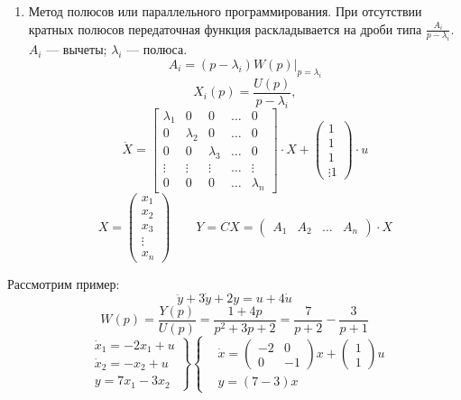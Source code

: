 \begin{enumerate}
	\item Метод полюсов или параллельного программирования.
		При отсутствии кратных полюсов передаточная функция раскладывается на дроби
		типа $\frac{A_i}{p - \lambda_i}$. $A_i$ --- вычеты; $\lambda_i$ --- полюса.
		\[A_i = (p - \lambda_i)W(p) |_{p=\lambda_i}\]
		\[X_i(p) = \frac{U(p)}{p-\lambda_i}, \]
		\[\dot X = \begin{bmatrix} \lambda_1 & 0 & 0 & \hdots & 0 \\
			0 & \lambda_2 & 0 & \hdots & 0 \\
			0 & 0 & \lambda_3 & \hdots & 0 \\
			\vdots & \vdots & \vdots & \hdots & \vdots\\
			0 & 0 & 0 & \hdots & \lambda_n
			\end{bmatrix} \cdot X + \begin{pmatrix}
			1 \\ 1\\ 1\\ \vdots 1
		\end{pmatrix} \cdot u\]
		\[X = \begin{pmatrix}x_1 \\ x_2 \\ x_3 \\ \vdots \\ x_n \end{pmatrix}\qquad Y = CX
			= \begin{pmatrix}A_1 & A_2 & \hdots & A_n\end{pmatrix} \cdot X\]
	\end{enumerate}\par

Рассмотрим пример:
\[\ddot y + 3 \dot y + 2y = u + 4 \dot u\]
\[W(p) = \frac{Y(p)}{U(p)} = \frac{1 + 4p}{p^2 + 3p + 2} = \frac{7}{p+2} -
\frac{3}{p+1}\]
\[\left.\begin{aligned} &\dot x_1 = -2x_1 + u \\
									&\dot x_2 = -x_2 + u \\
									&y = 7x_1 - 3x_2\end{aligned}\right\} 
\left\{\begin{aligned}
	&\dot x = \begin{pmatrix} -2 & 0 \\ 0 & -1\end{pmatrix}x +
	\begin{pmatrix}1 \\ 1\end{pmatrix}u\\
	&y = (7 - 3)x
\end{aligned}\right.\]
